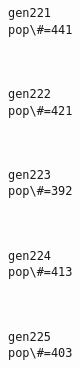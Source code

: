 \documentclass[11pt]{article}
\begin{document}
    \begin{Verbatim}[commandchars=\\\{\}]
gen221
pop\#=441

    \end{Verbatim}

    \begin{center}
    \end{center}
    { \hspace*{\fill} \\}
    
    \begin{Verbatim}[commandchars=\\\{\}]
gen222
pop\#=421

    \end{Verbatim}

    \begin{center}
    \end{center}
    { \hspace*{\fill} \\}
    
    \begin{Verbatim}[commandchars=\\\{\}]
gen223
pop\#=392

    \end{Verbatim}

    \begin{center}
    \end{center}
    { \hspace*{\fill} \\}
    
    \begin{Verbatim}[commandchars=\\\{\}]
gen224
pop\#=413

    \end{Verbatim}

    \begin{center}
    \end{center}
    { \hspace*{\fill} \\}
    
    \begin{Verbatim}[commandchars=\\\{\}]
gen225
pop\#=403

    \end{Verbatim}
\end{document}
